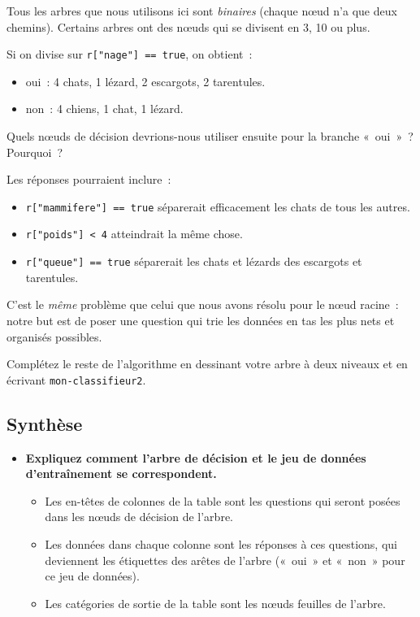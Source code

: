 \documentclass[12pt,a4paper]{article}
\begin{document}
\begin{instructornotes}
  Tous les arbres que nous utilisons ici sont \emph{binaires} (chaque nœud n'a que deux chemins). Certains arbres ont des nœuds qui se divisent en 3, 10 ou plus.

  Si on divise sur \texttt{r["nage"] == true}, on obtient~:
  \begin{itemize}
    \item oui~: 4 chats, 1 lézard, 2 escargots, 2 tarentules.
    \item non~: 4 chiens, 1 chat, 1 lézard.
  \end{itemize}
\end{instructornotes}

\begin{activitybox}
  Quels nœuds de décision devrions-nous utiliser ensuite pour la branche «~oui~»~? Pourquoi~?

  Les réponses pourraient inclure~:
  \begin{itemize}
    \item \texttt{r["mammifere"] == true} séparerait efficacement les chats de tous les autres.
    \item \texttt{r["poids"] < 4} atteindrait la même chose.
    \item \texttt{r["queue"] == true} séparerait les chats et lézards des escargots et tarentules.
  \end{itemize}

  C'est le \emph{même} problème que celui que nous avons résolu pour le nœud racine~: notre but est de poser une question qui trie les données en tas les plus nets et organisés possibles.

  Complétez le reste de l'algorithme en dessinant votre arbre à deux niveaux et en écrivant \texttt{mon-classifieur2}.
\end{activitybox}

\subsection{Synthèse}

\begin{thinkbox}
  \begin{itemize}
    \item \textbf{Expliquez comment l'arbre de décision et le jeu de données d'entraînement se correspondent.}
    \begin{itemize}
      \item Les en-têtes de colonnes de la table sont les questions qui seront posées dans les nœuds de décision de l'arbre.
      \item Les données dans chaque colonne sont les réponses à ces questions, qui deviennent les étiquettes des arêtes de l'arbre («~oui~» et «~non~» pour ce jeu de données).
      \item Les catégories de sortie de la table sont les nœuds feuilles de l'arbre.
    \end{itemize}
  \end{itemize}
\end{thinkbox}
\end{document}
